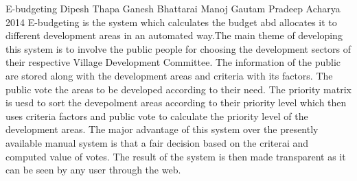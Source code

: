  \begin{conf-abstract}[]
{E-budgeting}
{
Dipesh Thapa
Ganesh Bhattarai
Manoj Gautam
Pradeep Acharya
}
{2014}
E-budgeting is the system which calculates the budget abd allocates it to different development areas in an automated way.The main theme of developing this system is to involve the public people for choosing the development sectors of their respective Village Development Committee. The information of the public are stored along with the development areas and criteria with its factors. The public vote the areas to be developed according to their need. The priority matrix is uesd to sort the devepolment areas according to their priority level which then uses criteria factors and public vote to calculate the priority level of the development areas. The major advantage of this system over the presently available manual system is that a fair decision based on the criterai and computed value of votes. The result of the system is then made transparent as it can be seen by any user through the web.
  \end{conf-abstract}